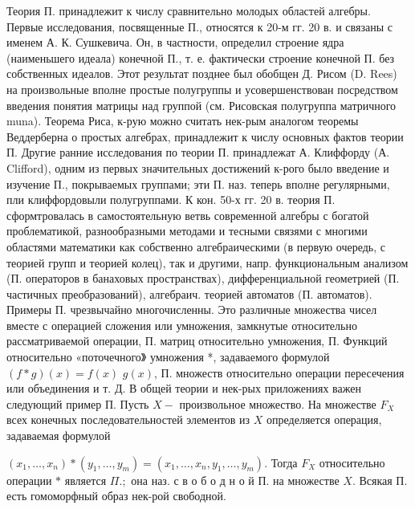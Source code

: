 \documentclass[10pt]{article}
\begin{document}
Теория П. принадлежит к числу сравнительно молодых областей алгебры. Первые исследования, посвященные П., относятся к 20-м гг. 20 в. и связаны с именем А. К. Сушкевича. Он, в частности, определил строение ядра (наименьшего идеала) конечной П., т. е. фактически строение конечной П. без собственных идеалов. Этот результат позднее был обобщен Д. Рисом (D. Rees) на произвольные вполне простые полугруппы и усовершенствован посредством введения понятия матрицы над группой (см. Рисовская полугруппа матричного muna). Теорема Риса, к-рую можно считать нек-рым аналогом теоремы Веддерберна о простых алгебрах, принадлежит к числу основных фактов теории П. Другие ранние исследования по теории П. принадлежат А. Клиффорду (А. Clifford), одним из первых значительных достижений к-рого было введение и изучение П., покрываемых группами; эти П. наз. теперь вполне регулярными, пли клиффордовыли полугруппами. К кон. 50-х гг. 20 в. теория П. сформтровалась в самостоятельную ветвь современной алгебры с богатой проблематикой, разнообразными методами и тесными связями с многими областями математики как собственно алгебраическими (в первую очередь, с теорией групп и теорией колец), так и другими, напр. функциональным анализом (П. операторов в банаховых пространствах), дифференциальной геометрией (П. частичных преобразований), алгебраич. теорией автоматов (П. автоматов). Примеры П. чрезвычайно многочисленны. Это различные множества чисел вместе с операцией сложения или умножения, замкнутые относительно рассматриваемой операции, П. матриц относительно умножения, П. Функций относительно «поточечного》 умножения *, задаваемого формулой $(f * g)(x)=f(x)$ $g(x)$, П. множеств относительно операции пересечения или объединения и т. Д. В общей теории и нек-рых приложениях важен следующий пример П. Пусть $X-$ произвольное множество. На множестве $F_{X}$ всех конечных последовательностей элементов из $X$ определяется операция, задаваемая формулой



$\left(x_{1}, \ldots, x_{n}\right) *\left(y_{1}, \ldots, y_{m}\right)=\left(x_{1}, \ldots, x_{n}, y_{1}, \ldots, y_{m}\right)$. Тогда $F_{X}$ относительно операции $*$ является $\Pi . ;$ она наз. с в о б о д н о й П. на множестве $X$. Всякая П. есть гомоморфный образ нек-рой свободной.
\end{document}
